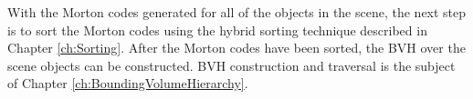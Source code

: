 With the Morton codes generated for all of the objects in the scene, the next step is to sort the Morton codes using the hybrid sorting technique described in Chapter \ref{ch:Sorting}. After the Morton codes have been sorted, the BVH over the scene objects can be constructed. BVH construction and traversal is the subject of Chapter \ref{ch:BoundingVolumeHierarchy}.
